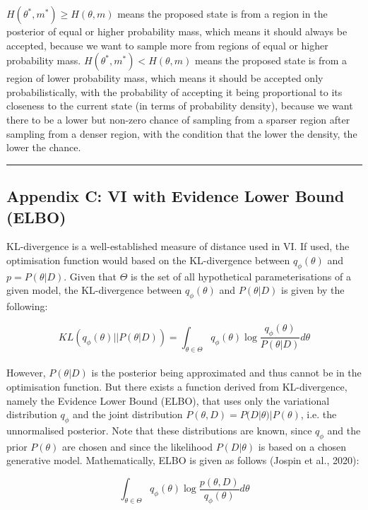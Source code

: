 \documentclass[conference]{IEEEtran}
\begin{document}
$H(\theta^*, m^*) \geq H(\theta, m)$ means the proposed state is from a region in the posterior of equal or higher probability mass, which means it should always be accepted, because we want to sample more from regions of equal or higher probability mass. $H(\theta^*, m^*) < H(\theta, m)$ means the proposed state is from a region of lower probability mass, which means it should be accepted only probabilistically, with the probability of accepting it being proportional to its closeness to the current state (in terms of probability density), because we want there to be a lower but non-zero chance of sampling from a sparser region after sampling from a denser region, with the condition that the lower the density, the lower the chance.

\par\noindent\rule{0.49\textwidth}{0.1pt}

\subsection*{Appendix C: VI with Evidence Lower Bound (ELBO)}
KL-divergence is a well-established measure of distance used in VI. If used, the optimisation function would based on the KL-divergence between $q_\phi(\theta)$ and $p = P(\theta|D)$. Given that $\Theta$ is the set of all hypothetical parameterisations of a given model, the KL-divergence between $q_\phi(\theta)$ and $P(\theta|D)$ is given by the following:

\begin{equation*}
	KL(q_\phi(\theta) || P(\theta|D))
	= \int_{\theta \in \Theta} q_\phi(\theta) \log \frac{q_\phi(\theta)}{P(\theta|D)} d\theta
\end{equation*}\\

However, $P(\theta|D)$ is the posterior being approximated and thus cannot be in the optimisation function. But there exists a function derived from KL-divergence, namely the Evidence Lower Bound (ELBO), that uses only the variational distribution $q_\phi$ and the joint distribution $P(\theta, D) = P(D|\theta)|P(\theta)$, i.e. the unnormalised posterior. Note that these distributions are known, since $q_\phi$ and the prior $P(\theta)$ are chosen and since the likelihood $P(D|\theta)$ is based on a chosen generative model. Mathematically, ELBO is given as follows (Jospin et al., 2020):

\begin{equation*}
	\int_{\theta \in \Theta} q_\phi(\theta) \log \frac{p(\theta, D)}{q_\phi(\theta)} d\theta
\end{equation*}\\
\end{document}
